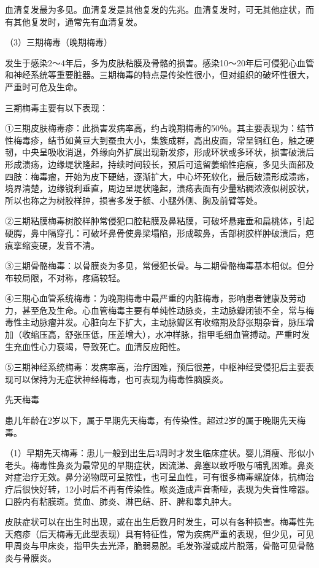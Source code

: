 \documentclass[12pt,UTF8,openany]{ctexbook}
\begin{document}
血清复发最为多见。血清复发是其他复发的先兆。血清复发时，可无其他症状，而有其他复发时，通常先有血清复发。

（3）三期梅毒（晚期梅毒）

发生于感染2～4年后，多为皮肤粘膜及骨骼的损害。感染10～20年后可侵犯心血管和神经系统等重要脏器。三期梅毒的特点是传染性很小，但对组织的破坏性很大，严重时可危及生命。

三期梅毒主要有以下表现：

①三期皮肤梅毒疹：此损害发病率高，约占晚期梅毒的50％。其主要表现为：结节性梅毒疹，结节如黄豆大到蚕虫大小，集簇成群，高出皮面，常呈铜红色，触之硬韧，中央呈吸收消退，外缘向外扩展出现新发疹，形成环状或多环状，损害破溃后形成溃疡，边缘堤状隆起，持续时间较长，预后可遗留萎缩性疤痕，多见头面部及四肢：梅毒瘤，开始为皮下硬结，逐渐扩大，中心坏死软化，最后破溃形成溃疡，境界清楚，边缘锐利垂直，周边呈堤状隆起，溃疡表面有少量粘稠浓液似树胶状，所以也称之为树胶样肿，损害多发于额、小腿外侧、胸及前臂等处。

②三期粘膜梅毒树胶样肿常侵犯口腔粘膜及鼻粘膜，可破坏悬雍垂和扁桃体，引起硬腭，鼻中隔穿孔：可破坏鼻骨使鼻梁塌陷，形成鞍鼻，舌部树胶样肿破溃后，疤痕挛缩变硬，发音不清。

③三期骨骼梅毒：以骨膜炎为多见，常侵犯长骨。与二期骨骼梅毒基本相似。但分布较局限，不对称，疼痛较轻。

④三期心血管系统梅毒：为晚期梅毒中最严重的内脏梅毒，影响患者健康及劳动力，甚至危及生命。心血管梅毒主要有单纯性动脉炎，主动脉瓣闭锁不全，常与梅毒性主动脉瘤并发。心脏向左下扩大，主动脉瓣区有收缩期及舒张期杂音，脉压增加（收缩压高，舒张压低，压差增大），水冲样脉，指甲毛细血管搏动。严重时发生充血性心力衰竭，导致死亡。血清反应阳性。

⑤三期神经系统梅毒：发病率高，治疗困难，预后很差，中枢神经受侵犯后主要表现可以保持为无症状神经梅毒，也可表现为梅毒性脑膜炎。

先天梅毒

患儿年龄在2岁以下，属于早期先天梅毒，有传染性。超过2岁的属于晚期先天梅毒。

（1）早期先天梅毒：患儿一般到出生后3周时才发生临床症状。婴儿消瘦、形似小老头。梅毒性鼻炎为最常见的早期症状，因流涕、鼻塞以致呼吸与哺乳困难。鼻炎对症治疗无效。鼻分泌物既可呈脓性，也可呈血性，可有很多梅毒螺旋体，抗梅治疗后很快好转，12小时后不再有传染性。喉炎造成声音嘶哑，表现为失音性啼器。口腔内有粘膜斑。贫血、肺炎、淋巴结、肝、脾和睾丸肿大。

皮肤症状可以在出生时出现，或在出生后数月时发生，可以有各种损害。梅毒性先天疱疹（后天梅毒无此型表现）具有特征性，常为疾病严重的表现，但少见，可见甲周炎与甲床炎，指甲失去光泽，脆弱易脱。毛发弥漫或成片脱落，骨骼可见骨骼炎与骨膜炎。
\end{document}
